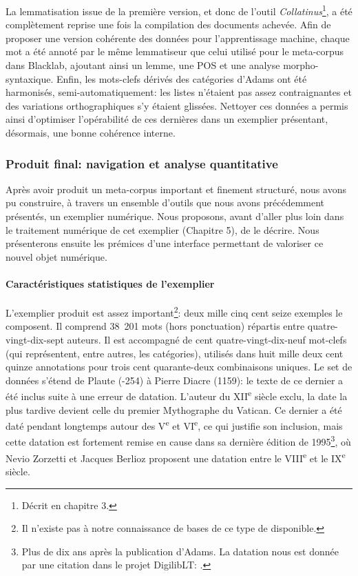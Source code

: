 La lemmatisation issue de la première version, et donc de l'outil \textit{Collatinus}\footnote{Décrit en chapitre 3.}, a été complètement reprise une fois la compilation des documents achevée. Afin de proposer une version cohérente des données pour l'apprentissage machine, chaque mot a été annoté par le même lemmatiseur que celui utilisé pour le meta-corpus dans Blacklab, ajoutant ainsi un lemme, une POS et une analyse morpho-syntaxique. Enfin, les mots-clefs dérivés des catégories d'Adams ont été harmonisés, semi-automatiquement: les listes n'étaient pas assez contraignantes et des variations orthographiques s'y étaient glissées. Nettoyer ces données a permis ainsi d'optimiser l'opérabilité de ces dernières dans un exemplier présentant, désormais, une bonne cohérence interne.


\subsubsection{Produit final: navigation et analyse quantitative}

Après avoir produit un meta-corpus important et finement structuré, nous avons pu construire, à travers un ensemble d'outils que nous avons précédemment présentés, un exemplier numérique. Nous proposons, avant d'aller plus loin dans le traitement numérique de cet exemplier (Chapitre 5), de le décrire. Nous présenterons ensuite les prémices d'une interface permettant de valoriser ce nouvel objet numérique.

\paragraph{Caractéristiques statistiques de l'exemplier}

L'exemplier produit est assez important\footnote{Il n'existe pas à notre connaissance de bases de ce type de disponible.}: deux mille cinq cent seize exemples le composent. Il comprend 38~201 mots (hors ponctuation) répartis entre quatre-vingt-dix-sept auteurs. Il est accompagné de cent quatre-vingt-dix-neuf mot-clefs (qui représentent, entre autres, les catégories), utilisés dans huit mille deux cent quinze annotations pour trois cent quarante-deux combinaisons uniques. Le set de données s'étend de Plaute (-254) à Pierre Diacre (1159): le texte de ce dernier a été inclus suite à une erreur de datation. L'auteur du XII\textsuperscript{e} siècle exclu, la date la plus tardive devient celle du premier Mythographe du Vatican. Ce dernier a été daté pendant longtemps autour des V\textsuperscript{e} et VI\textsuperscript{e}, ce qui justifie son inclusion, mais cette datation est fortement remise en cause dans sa dernière édition de 1995\footnote{Plus de dix ans après la publication d'Adams. La datation nous est donnée par une citation dans le projet DigilibLT: \textcite{zorzetti_premier_1995}.}, où Nevio Zorzetti et Jacques Berlioz proposent une datation entre le VIII\textsuperscript{e} et le IX\textsuperscript{e} siècle.

